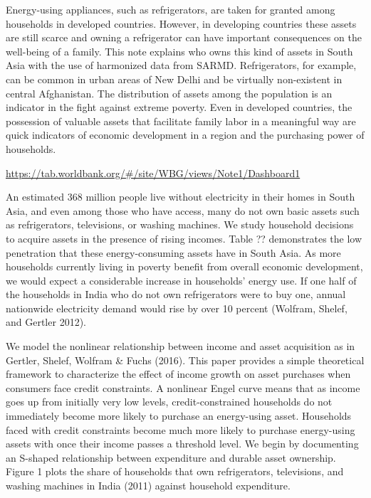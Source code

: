 \documentclass[13 pt,]{book}
\begin{document}
Energy-using appliances, such as refrigerators, are taken for granted
among households in developed countries. However, in developing
countries these assets are still scarce and owning a refrigerator can
have important consequences on the well-being of a family. This note
explains who owns this kind of assets in South Asia with the use of
harmonized data from SARMD. Refrigerators, for example, can be common in
urban areas of New Delhi and be virtually non-existent in central
Afghanistan. The distribution of assets among the population is an
indicator in the fight against extreme poverty. Even in developed
countries, the possession of valuable assets that facilitate family
labor in a meaningful way are quick indicators of economic development
in a region and the purchasing power of households.

\url{https://tab.worldbank.org/\#/site/WBG/views/Note1/Dashboard1}

An estimated 368 million people live without electricity in their homes
in South Asia, and even among those who have access, many do not own
basic assets such as refrigerators, televisions, or washing machines. We
study household decisions to acquire assets in the presence of rising
incomes. Table ?? demonstrates the low penetration that these
energy-consuming assets have in South Asia. As more households currently
living in poverty benefit from overall economic development, we would
expect a considerable increase in households' energy use. If one half of
the households in India who do not own refrigerators were to buy one,
annual nationwide electricity demand would rise by over 10 percent
(Wolfram, Shelef, and Gertler 2012).

We model the nonlinear relationship between income and asset acquisition
as in Gertler, Shelef, Wolfram \& Fuchs (2016). This paper provides a
simple theoretical framework to characterize the effect of income growth
on asset purchases when consumers face credit constraints. A nonlinear
Engel curve means that as income goes up from initially very low levels,
credit-constrained households do not immediately become more likely to
purchase an energy-using asset. Households faced with credit constraints
become much more likely to purchase energy-using assets with once their
income passes a threshold level. We begin by documenting an S-shaped
relationship between expenditure and durable asset ownership. Figure 1
plots the share of households that own refrigerators, televisions, and
washing machines in India (2011) against household expenditure.
\end{document}
